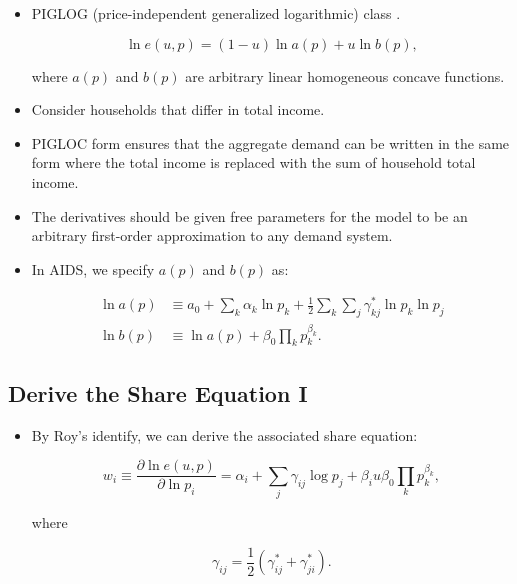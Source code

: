 \documentclass[]{book}
\providecommand{\tightlist}{%
  \setlength{\itemsep}{0pt}\setlength{\parskip}{0pt}}
\begin{document}
\begin{itemize}
\tightlist
\item
  PIGLOG (price-independent generalized logarithmic) class
  \citep{Muellbauer1976}.

  \begin{equation}
  \ln e(u, p) = (1 - u) \ln a(p) + u\ln b(p),
  \end{equation}

  where \(a(p)\) and \(b(p)\) are arbitrary linear homogeneous concave
  functions.
\item
  Consider households that differ in total income.
\item
  PIGLOC form ensures that the aggregate demand can be written in the
  same form where the total income is replaced with the sum of household
  total income.
\item
  The derivatives should be given free parameters for the model to be an
  arbitrary first-order approximation to any demand system.
\item
  In AIDS, we specify \(a(p)\) and \(b(p)\) as:

  \begin{equation}
  \begin{split}
  \ln a(p) &\equiv a_0 + \sum_{k} \alpha_k \ln p_k + \frac{1}{2}\sum_{k} \sum_{j} \gamma_{kj}^* \ln p_k \ln p_j\\
  \ln b(p) &\equiv \ln a(p) + \beta_0  \prod_{k} p_k^{\beta_k}.
  \end{split}
  \end{equation}
\end{itemize}

\subsection{Derive the Share Equation
I}\label{derive-the-share-equation-i}

\begin{itemize}
\tightlist
\item
  By Roy's identify, we can derive the associated share equation:

  \begin{equation}
  w_i \equiv \frac{\partial \ln e(u, p)}{\partial \ln p_i} = \alpha_i + \sum_{j} \gamma_{ij} \log p_j + \beta_i u \beta_0 \prod_{k} p_k^{\beta_k},
  \end{equation}

  where

  \begin{equation}
  \gamma_{ij} = \frac{1}{2}(\gamma_{ij}^* + \gamma_{ji}^*).
  \end{equation}
\end{itemize}
\end{document}
